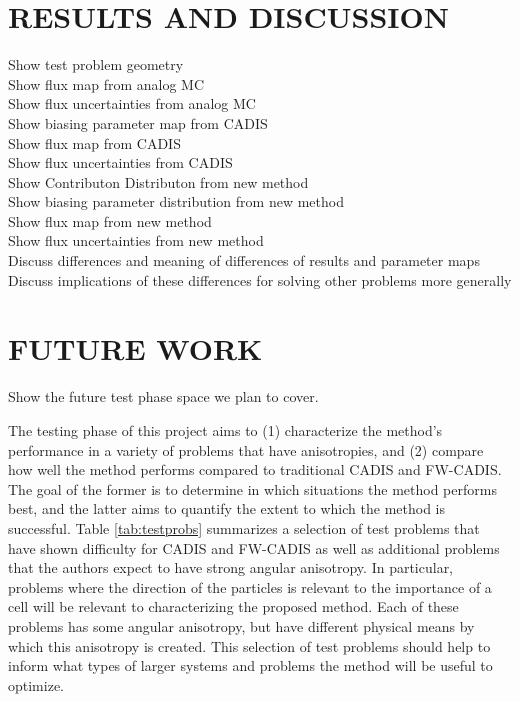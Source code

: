 \documentclass[12pt]{article}
\begin{document}
%
\section{RESULTS AND DISCUSSION} 
\label{sect::results}

Show test problem geometry
\\ Show flux map from analog MC
\\ Show flux uncertainties from analog MC
\\ Show biasing parameter map from CADIS
\\ Show flux map from CADIS
\\ Show flux uncertainties from CADIS
\\ Show Contributon Distributon from new method
\\ Show biasing parameter distribution from new method
\\ Show flux map from new method
\\ Show flux uncertainties from new method
\\ Discuss differences and meaning of differences of results and parameter maps
\\ Discuss implications of these differences for solving other problems more generally

%
\section{FUTURE WORK} 
\label{sect::future}

Show the future test phase space we plan to cover. 

The testing phase of this project aims to (1) characterize the method's performance in a variety of problems that have anisotropies, and (2) compare how well the method performs compared to traditional CADIS and FW-CADIS.
The goal of the former is to determine in which situations the method performs best, and the latter aims to quantify the extent to which the method is successful. 
Table \ref{tab:testprobs} summarizes a selection of test problems that have shown difficulty for CADIS and FW-CADIS as well as additional problems that the authors expect to have strong angular anisotropy. 
In particular, problems where the direction of the particles is relevant to the importance of a cell will be relevant to characterizing the proposed method. 
Each of these problems has some angular anisotropy, but have different physical means by which this anisotropy is created. 
This selection of test problems should help to inform what types of larger systems and problems the method will be useful to optimize. 
\end{document}
